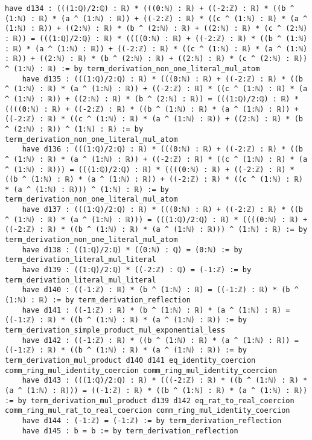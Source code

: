 \documentclass{article}
\begin{document}
\begin{tcolorbox}[colback=white!10, width=\linewidth]
\begin{lstlisting}[language=Lean4]
    have d134 : (((1:ℚ)/2:ℚ) : ℝ) * (((0:ℕ) : ℝ) + ((-2:ℤ) : ℝ) * ((b ^ (1:ℕ) : ℝ) * (a ^ (1:ℕ) : ℝ)) + ((-2:ℤ) : ℝ) * ((c ^ (1:ℕ) : ℝ) * (a ^ (1:ℕ) : ℝ)) + ((2:ℕ) : ℝ) * (b ^ (2:ℕ) : ℝ) + ((2:ℕ) : ℝ) * (c ^ (2:ℕ) : ℝ)) = (((1:ℚ)/2:ℚ) : ℝ) * ((((0:ℕ) : ℝ) + ((-2:ℤ) : ℝ) * ((b ^ (1:ℕ) : ℝ) * (a ^ (1:ℕ) : ℝ)) + ((-2:ℤ) : ℝ) * ((c ^ (1:ℕ) : ℝ) * (a ^ (1:ℕ) : ℝ)) + ((2:ℕ) : ℝ) * (b ^ (2:ℕ) : ℝ) + ((2:ℕ) : ℝ) * (c ^ (2:ℕ) : ℝ)) ^ (1:ℕ) : ℝ) := by term_derivation_non_one_literal_mul_atom
    have d135 : (((1:ℚ)/2:ℚ) : ℝ) * (((0:ℕ) : ℝ) + ((-2:ℤ) : ℝ) * ((b ^ (1:ℕ) : ℝ) * (a ^ (1:ℕ) : ℝ)) + ((-2:ℤ) : ℝ) * ((c ^ (1:ℕ) : ℝ) * (a ^ (1:ℕ) : ℝ)) + ((2:ℕ) : ℝ) * (b ^ (2:ℕ) : ℝ)) = (((1:ℚ)/2:ℚ) : ℝ) * ((((0:ℕ) : ℝ) + ((-2:ℤ) : ℝ) * ((b ^ (1:ℕ) : ℝ) * (a ^ (1:ℕ) : ℝ)) + ((-2:ℤ) : ℝ) * ((c ^ (1:ℕ) : ℝ) * (a ^ (1:ℕ) : ℝ)) + ((2:ℕ) : ℝ) * (b ^ (2:ℕ) : ℝ)) ^ (1:ℕ) : ℝ) := by term_derivation_non_one_literal_mul_atom
    have d136 : (((1:ℚ)/2:ℚ) : ℝ) * (((0:ℕ) : ℝ) + ((-2:ℤ) : ℝ) * ((b ^ (1:ℕ) : ℝ) * (a ^ (1:ℕ) : ℝ)) + ((-2:ℤ) : ℝ) * ((c ^ (1:ℕ) : ℝ) * (a ^ (1:ℕ) : ℝ))) = (((1:ℚ)/2:ℚ) : ℝ) * ((((0:ℕ) : ℝ) + ((-2:ℤ) : ℝ) * ((b ^ (1:ℕ) : ℝ) * (a ^ (1:ℕ) : ℝ)) + ((-2:ℤ) : ℝ) * ((c ^ (1:ℕ) : ℝ) * (a ^ (1:ℕ) : ℝ))) ^ (1:ℕ) : ℝ) := by term_derivation_non_one_literal_mul_atom
    have d137 : (((1:ℚ)/2:ℚ) : ℝ) * (((0:ℕ) : ℝ) + ((-2:ℤ) : ℝ) * ((b ^ (1:ℕ) : ℝ) * (a ^ (1:ℕ) : ℝ))) = (((1:ℚ)/2:ℚ) : ℝ) * ((((0:ℕ) : ℝ) + ((-2:ℤ) : ℝ) * ((b ^ (1:ℕ) : ℝ) * (a ^ (1:ℕ) : ℝ))) ^ (1:ℕ) : ℝ) := by term_derivation_non_one_literal_mul_atom
    have d138 : ((1:ℚ)/2:ℚ) * ((0:ℕ) : ℚ) = (0:ℕ) := by term_derivation_literal_mul_literal
    have d139 : ((1:ℚ)/2:ℚ) * ((-2:ℤ) : ℚ) = (-1:ℤ) := by term_derivation_literal_mul_literal
    have d140 : ((-1:ℤ) : ℝ) * (b ^ (1:ℕ) : ℝ) = ((-1:ℤ) : ℝ) * (b ^ (1:ℕ) : ℝ) := by term_derivation_reflection
    have d141 : ((-1:ℤ) : ℝ) * (b ^ (1:ℕ) : ℝ) * (a ^ (1:ℕ) : ℝ) = ((-1:ℤ) : ℝ) * ((b ^ (1:ℕ) : ℝ) * (a ^ (1:ℕ) : ℝ)) := by term_derivation_simple_product_mul_exponential_less
    have d142 : ((-1:ℤ) : ℝ) * ((b ^ (1:ℕ) : ℝ) * (a ^ (1:ℕ) : ℝ)) = ((-1:ℤ) : ℝ) * ((b ^ (1:ℕ) : ℝ) * (a ^ (1:ℕ) : ℝ)) := by term_derivation_mul_product d140 d141 eq_identity_coercion comm_ring_mul_identity_coercion comm_ring_mul_identity_coercion
    have d143 : (((1:ℚ)/2:ℚ) : ℝ) * (((-2:ℤ) : ℝ) * ((b ^ (1:ℕ) : ℝ) * (a ^ (1:ℕ) : ℝ))) = ((-1:ℤ) : ℝ) * ((b ^ (1:ℕ) : ℝ) * (a ^ (1:ℕ) : ℝ)) := by term_derivation_mul_product d139 d142 eq_rat_to_real_coercion comm_ring_mul_rat_to_real_coercion comm_ring_mul_identity_coercion
    have d144 : (-1:ℤ) = (-1:ℤ) := by term_derivation_reflection
    have d145 : b = b := by term_derivation_reflection

\end{lstlisting}
\end{tcolorbox}
\end{document}
